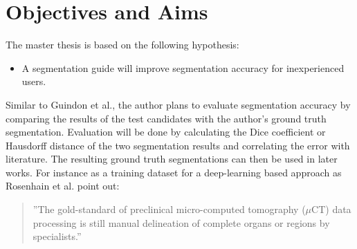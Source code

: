 \section{Objectives and Aims}
\begin{body}
	The master thesis is based on the following hypothesis:
	\begin{itemize}
		\item A segmentation guide will improve segmentation accuracy for inexperienced users.
	\end{itemize}
	Similar to Guindon et al.\cite{diceMeasuresAmountEcologic1945}, the author plans to evaluate segmentation accuracy by comparing the results of the test candidates with the author's ground truth segmentation\cite{ruberteMorphologicalMousePhenotyping2017}. Evaluation will be done by calculating the Dice coefficient\cite{diceMeasuresAmountEcologic1945} or Hausdorff distance\cite{birsanOneHundredYears2006} of the two segmentation results and correlating the error with literature\cite{kenneyHighthroughputSemiautomatedBone2022,malimbanDeepLearningbasedSegmentation2022,khmelinskiiSegmentationVisualAnalysis2012a}. The resulting ground truth segmentations can then be used in later works. For instance as a training dataset for a deep-learning based approach as Rosenhain et al. point out:
	\begin{quotation}
		\noindent
		''The gold-standard of preclinical micro-computed tomography ($\mu$CT) data processing is still manual delineation of complete organs or regions by specialists.''\cite{rosenhainPreclinicalMicrocomputedTomography2018}
	\end{quotation}
\end{body}
\clearpage
